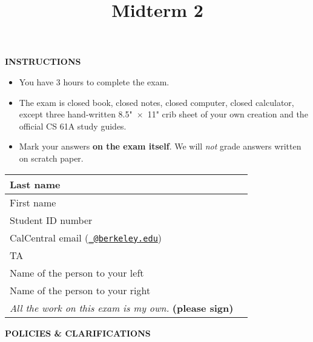 \documentclass[twoside]{article}
\title{\sc Midterm 2 \solution{Solutions}}
\begin{document}
\thispagestyle{empty}
\maketitle

\medskip

\textbf{INSTRUCTIONS}

\begin{itemize}
\item You have 3 hours to complete the exam.

\item The exam is closed book, closed notes, closed computer, closed calculator,
except three hand-written 8.5"~$\times$~11" crib sheet of your own creation and
the official CS 61A study guides.

\item Mark your answers \textbf{on the exam itself}. We will \emph{not} grade
answers written on scratch paper.
\end{itemize}

\medskip

\begin{center}
\begin{tabular}{|m{6cm}|m{8cm}|}
\hline
Last name & \\ [0.8cm]
\hline
First name & \\ [0.8cm]
\hline
Student ID number & \\ [0.8cm]
\hline
CalCentral email (\href{http://berkeley.edu}{\nolinkurl{\_@berkeley.edu}}) & \\ [0.8cm]
\hline
TA & \\ [0.8cm]
\hline
Name of the person to your left & \\ [0.8cm]
\hline
Name of the person to your right & \\ [0.8cm]
\hline
\emph{All the work on this exam is my own.} \textbf{(please sign)} & \\ [0.8cm]
\hline
\end{tabular}
\end{center}

\textbf{POLICIES \& CLARIFICATIONS}
\end{document}
